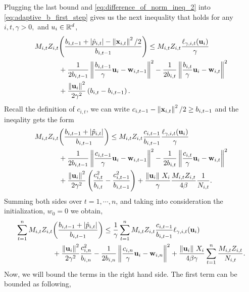 Plugging the  last bound and \eqref{eq:difference_of_norm_ineq_2} into \eqref{eq:adaptive_b_first_step} gives us the next inequality that holds for any $i,t,\gamma>0,$ and $u_i\in\mathbb{R}^d$,
\begin{equation*}
\begin{split}
M_{i,t}Z_{i,t}&{\left({\frac{b_{i,t-1} +\left\vert{\hat{p}_{i,t}}\right\vert-\left\Vert {\mathbf{x}_{i,t}} \right\Vert^2/2}{b_{i,t-1}}}\right)} \le M_{i,t}Z_{i,t}\frac{\ell_{\gamma,i,t}(\mathbf{u}_i)}{\gamma}\\
&+\frac{1}{2b_{i,t-1}}\left\Vert {\frac{b_{i,t-1}}{\gamma} \mathbf{u}_i-\mathbf{w}_{i,t-1}} \right\Vert^2-\frac{1}{2b_{i,t}}\left\Vert {\frac{b_{i,t}}{\gamma} \mathbf{u}_i-\mathbf{w}_{i,t}} \right\Vert^2\\
&+\frac{\left\Vert {\mathbf{u}_i} \right\Vert^2}{2\gamma^2}\left({b_{{i,t}}-b_{{i,t-1}}}\right)
.
\end{split}
\end{equation*}
Recall the definition of $c_{i,t}$, we can write $c_{i,t-1}-\left\Vert {\mathbf{x}_{i,t}} \right\Vert^2/2\ge b_{i,t-1}$ and the ineqality gets the form
\begin{equation*}
\begin{split}
M_{i,t}Z_{i,t}&{\left({\frac{b_{i,t-1} +\left\vert{\hat{p}_{i,t}}\right\vert}{b_{i,t-1}}}\right)} \le M_{i,t}Z_{i,t}\frac{c_{i,t-1}}{b_{i,t-1}}\frac{\ell_{\gamma,i,t}(\mathbf{u}_i)}{\gamma}\\
&+\frac{1}{2b_{i,t-1}}\left\Vert {\frac{c_{i,t-1}}{\gamma} \mathbf{u}_i-\mathbf{w}_{i,t-1}} \right\Vert^2-\frac{1}{2b_{i,t}}\left\Vert {\frac{c_{i,t}}{\gamma} \mathbf{u}_i-\mathbf{w}_{i,t}} \right\Vert^2\\
&+\frac{\left\Vert {\mathbf{u}_i} \right\Vert^2}{2\gamma^2}\left({\frac{c_{i,t}^2}{b_{i,t}}-\frac{c_{i,t-1}^2}{b_{i,t-1}}}\right)+
\frac{\Vert\mathbf{u}_i\Vert~ X_i}{\gamma}\frac{M_{i,t}Z_{i,t}}{4\beta}\frac{1}{N_{i,t}}.
\end{split}
\end{equation*}
Summing  both sides over $t=1,\cdots,n$, and taking into consideration the initialization,   $w_0=0$ we obtain,
\begin{equation}
\begin{split}
\sum_{t=1}^{n}M_{i,t}Z_{i,t}&{\left({\frac{b_{i,t-1} +\left\vert{\hat{p}_{i,t}}\right\vert}{b_{i,t-1}}}\right)} \le \frac{1}{\gamma}\sum_{t=1}^{n}{M_{i,t}Z_{i,t}\frac{c_{i,t-1}}{b_{i,t-1}}\ell_{\gamma,i,t}(\mathbf{u}_i)}\\
&+\frac{\left\Vert {\mathbf{u}_i} \right\Vert^2}{2\gamma^2}\frac{c_{i,n}^2}{b_{i,n}}-\frac{1}{2b_{i,n}}\left\Vert {\frac{c_{i,n}}{\gamma} \mathbf{u}_i-\mathbf{w}_{i,n}} \right\Vert^2
+\frac{\Vert\mathbf{u}_i\Vert~ X_i}{4\beta\gamma}\sum_{t=1}^{n}{\frac{M_{i,t}Z_{i,t}}{N_{i,t}}}.
\label{eq:first_sum}
\end{split}
\end{equation}
Now, we will bound the terms in the right hand side. The first term can be bounded as following,

